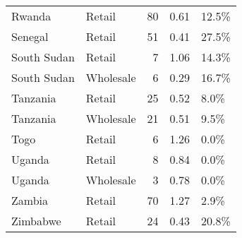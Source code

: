 \begin{table}[ht]
\begin{tabular}{llrrl}
  Rwanda & Retail &  80 & 0.61 & 12.5\% \\ 
  Senegal & Retail &  51 & 0.41 & 27.5\% \\ 
  South Sudan & Retail &   7 & 1.06 & 14.3\% \\ 
  South Sudan & Wholesale &   6 & 0.29 & 16.7\% \\ 
  Tanzania & Retail &  25 & 0.52 & 8.0\% \\ 
  Tanzania & Wholesale &  21 & 0.51 & 9.5\% \\ 
  Togo & Retail &   6 & 1.26 & 0.0\% \\ 
  Uganda & Retail &   8 & 0.84 & 0.0\% \\ 
  Uganda & Wholesale &   3 & 0.78 & 0.0\% \\ 
  Zambia & Retail &  70 & 1.27 & 2.9\% \\ 
  Zimbabwe & Retail &  24 & 0.43 & 20.8\% \\ 
   \hline
\end{tabular}
\end{table}
